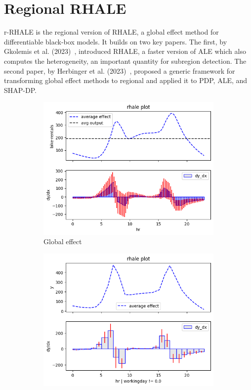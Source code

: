 \documentclass[
twocolumn,
]{ceurart}
\begin{document}
\section{Regional RHALE}


r-RHALE is the regional version of RHALE, a global effect method for differentiable black-box models. It builds on two key papers. The first, by Gkolemis et al. (2023)~\citep{gkolemis2023rhale}, introduced RHALE, a faster version of ALE which also computes the heterogeneity, an important quantity for subregion detection. The second paper, by Herbinger et al. (2023)~\citep{herbinger2023decomposing}, proposed a generic framework for transforming global effect methods to regional and applied it to PDP, ALE, and SHAP-DP.


\begin{figure}
  \centering
  \begin{subfigure}[t]{0.32\textwidth}
  \centering
  \includegraphics[width=\linewidth]{figures/running_example/01_bike_sharing_dataset_23_1.png}
  \caption{Global effect}
  \label{subfig:global}
  \end{subfigure}
  \begin{subfigure}[t]{0.32\textwidth}
  \centering
  \includegraphics[width=\linewidth]{figures/running_example/01_bike_sharing_dataset_29_1.png}

\end{subfigure}
\end{figure}
\end{document}
